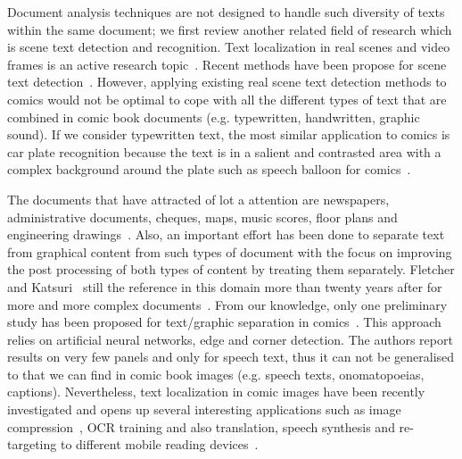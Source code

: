 Document analysis techniques are not designed to handle such diversity of texts within the same document; we first review another related field of research which is scene text detection and recognition.
Text localization in real scenes and video frames is an active research topic~\cite{Jung04,ShahabICDAR2011Robust,KaratzasICDAR2013Robust}.
Recent methods have been propose for scene text detection~\cite{kasar2012multi,gomez2013multi}.
However, applying existing real scene text detection methods to comics would not be optimal to cope with all the different types of text that are combined in comic book documents (e.g. typewritten, handwritten, graphic sound).
If we consider typewritten text, the most similar application to comics is car plate recognition because the text is in a salient and contrasted area with a complex background around the plate such as speech balloon for comics~\cite{anagnostopoulos2008license}.

The documents that have attracted of lot a attention are newspapers, administrative documents, cheques, maps, music scores, floor plans and engineering drawings~\cite{nagy2000twenty}.
Also, an important effort has been done to separate text from graphical content from such types of document with the focus on improving the post processing of both types of content by treating them separately.
Fletcher and Katsuri~\cite{fletcher1988robust} still the reference in this domain more than twenty years after for more and more complex documents~\cite{tombre2002text,Roy2007Text}.
From our knowledge, only one preliminary study has been proposed for text/graphic separation in comics~\cite{BernhauptWSES2001}.
This approach relies on artificial neural networks, edge and corner detection.
The authors report results on very few panels and only for speech text, thus it can not be generalised to that we can find in comic book images (e.g. speech texts, onomatopoeias, captions).
Nevertheless, text localization in comic images have been recently investigated and opens up several interesting applications such as image compression~\cite{Su11}, OCR training and also translation, speech synthesis and re-targeting to different mobile reading devices~\cite{Matsui2011}.

